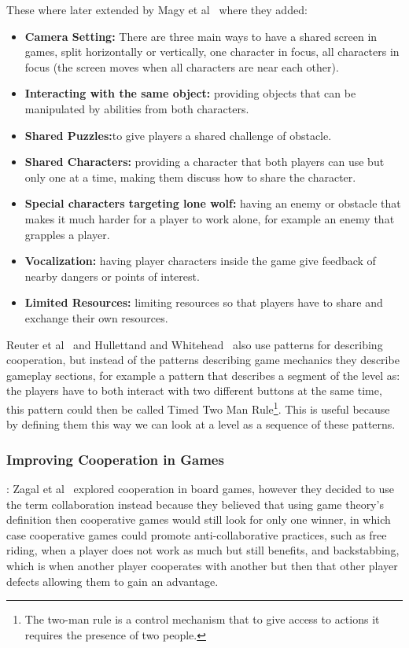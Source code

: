 \documentclass[runningheads]{llncs}
\begin{document}
These where later extended by Magy et al~\cite{ref_magy} where they added:
\begin{itemize}
    \item\textbf{Camera Setting:} There are three main ways to have a shared screen in games, split horizontally or vertically, one character in focus, all characters in focus (the screen moves when all characters are near each other). 
    \item\textbf{Interacting with the same object:} providing objects that can be manipulated by abilities from both characters.
    \item\textbf{Shared Puzzles:}to give players a shared challenge of obstacle. 
    \item\textbf{Shared Characters:} providing a character that both players can use but only one at a time, making them discuss how to share the character. 
    \item\textbf{Special characters targeting lone wolf:} having an enemy or obstacle that makes it much harder for a player to work alone, for example an enemy that grapples a player.
    \item\textbf{Vocalization:} having player characters inside the game give feedback of nearby dangers or points of interest.
    \item\textbf{Limited Resources:} limiting resources so that players have to share and exchange their own resources.
\end{itemize}

Reuter et al~\cite{ref_reuter} and Hullettand and Whitehead~\cite{ref_whitehead} also use patterns for describing cooperation, but instead of the patterns describing game mechanics they describe gameplay sections, for example a pattern that describes a segment of the level as: the players have to both interact with two different buttons at the same time, this pattern could then be called Timed Two Man Rule\footnote{The two-man rule is a control mechanism that to give access to actions it requires the presence of two people.}. This is useful because by defining them this way we can look at a level as a sequence of these patterns. 

\subsubsection{Improving Cooperation in Games}:
Zagal et al~\cite{ref_zagal} explored cooperation in board games, however they decided to use the term collaboration instead because they believed that using game theory's definition then cooperative games would still look for only one winner, in which case cooperative games could promote anti-collaborative practices, such as free riding, when a player does not work as much but still benefits, and backstabbing, which is when another player cooperates with another but then that other player defects allowing them to gain an advantage.
\end{document}
